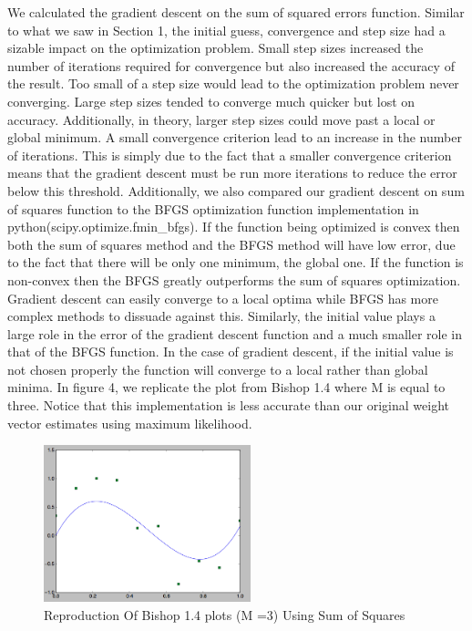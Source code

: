 \documentclass[pageno]{jpaper}
\begin{document}
We calculated the gradient descent on the sum of squared errors function. Similar to what we saw in Section 1, the initial guess, convergence and step size had a sizable impact on the optimization problem. Small step sizes increased the number of iterations required for convergence but also increased the accuracy of the result. Too small of a step size would lead to the optimization problem never converging. Large step sizes tended to converge much quicker but lost on accuracy. Additionally, in theory, larger step sizes could move past a local or global minimum. A small convergence criterion lead to an increase in the number of iterations. This is simply due to the fact that a smaller convergence criterion means that the gradient descent must be run more iterations to reduce the error below this threshold. 
Additionally, we also compared our gradient descent on sum of squares function to the BFGS optimization function implementation in python(scipy.optimize.fmin\_bfgs). If the function being optimized is convex then both the sum of squares method and the BFGS method will have low error, due to the fact that there will be only one minimum, the global one. If the function is non-convex then the BFGS greatly outperforms the sum of squares optimization. Gradient descent can easily converge to a local optima while BFGS has more complex methods to dissuade against this. Similarly, the initial value plays a large role in the error of the gradient descent function and a much smaller role in that of the BFGS function. In the case of gradient descent, if the initial value is not chosen properly the function will converge to a local rather than global minima. 
In figure 4, we replicate the plot from Bishop 1.4 where M is equal to three. Notice that this implementation is less accurate than our original weight vector estimates using maximum likelihood.
\begin{figure}[ht!]
\centering
\includegraphics[width=60mm]{M_3}
\caption{Reproduction Of Bishop 1.4 plots (M =3) Using Sum of Squares}
\label{overflow}
\end{figure}
\end{document}
